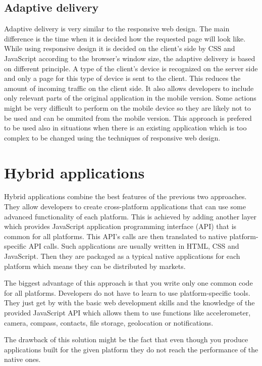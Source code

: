 \documentclass[12pt,oneside,final]{fithesis2}
\begin{document}
\subsection{Adaptive delivery}
Adaptive delivery is very similar to the responsive web design.
The main difference is the time when it is decided how the requested page will look like.
While using responsive design it is decided on the client's side by CSS and JavaScript according to the browser's window size, the adaptive delivery is based on different principle.
A type of the client's device is recognized on the server side and only a page for this type of device is sent to the client.
This reduces the amount of incoming traffic on the client side.
It also allows developers to include only relevant parts of the original application in the mobile version.
Some actions might be very difficult to perform on the mobile device so they are likely not to be used and can be ommited from the mobile version.
This approach is prefered to be used also in situations when there is an existing application which is too complex to be changed using the techniques of responsive web design.

\section{Hybrid applications}
Hybrid applications combine the best features of the previous two approaches.
They allow developers to create cross-platform applications that can use some advanced functionality of each platform.
This is achieved by adding another layer which provides JavaScript application programming interface (API) that is common for all platforms.
This API's calls are then translated to native platform-specific API calls.
Such applications are usually written in HTML, CSS and JavaScript.
Then they are packaged as a typical native applications for each platform which means they can be distributed by markets.

The biggest advantage of this approach is that you write only one common code for all platforms.
Developers do not have to learn to use platform-specific tools.
They just get by with the basic web development skills and the knowledge of the provided JavaScript API which allows them to use functions like accelerometer, camera, compass, contacts, file storage, geolocation or notifications.

The drawback of this solution might be the fact that even though you produce applications built for the given platform they do not reach the performance of the native ones.
\end{document}
